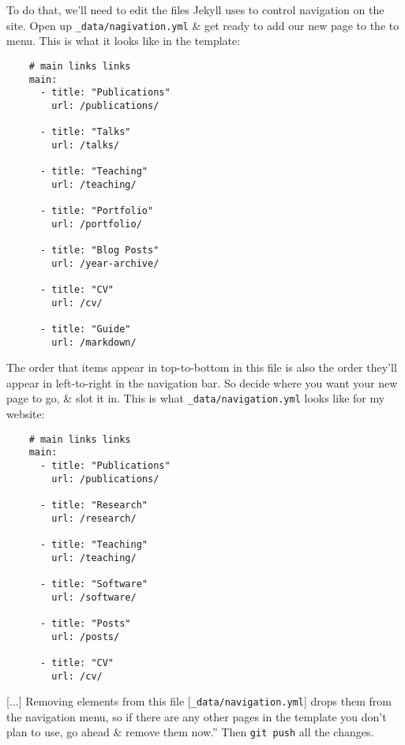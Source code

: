 \documentclass{article}
\numberwithin{equation}{section}
\begin{document}
To do that, we'll need to edit the files Jekyll uses to control navigation on the site. Open up \verb|_data/nagivation.yml| \& get ready to add our new page to the to menu. This is what it looks like in the template:
\begin{verbatim}
	# main links links
	main:
	  - title: "Publications"
	    url: /publications/
	
	  - title: "Talks"
	    url: /talks/    
	
	  - title: "Teaching"
	    url: /teaching/    
	    
	  - title: "Portfolio"
	    url: /portfolio/
	        
	  - title: "Blog Posts"
	    url: /year-archive/
	    
	  - title: "CV"
	    url: /cv/
	    
	  - title: "Guide"
	    url: /markdown/
\end{verbatim}
The order that items appear in top-to-bottom in this file is also the order they'll appear in left-to-right in the navigation bar. So decide where you want your new page to go, \& slot it in. This is what \verb|_data/navigation.yml| looks like for my website:
\begin{verbatim}
	# main links links
	main:
	  - title: "Publications"
	    url: /publications/
	    
	  - title: "Research"
	    url: /research/
	
	  - title: "Teaching"
	    url: /teaching/
	
	  - title: "Software"
	    url: /software/
	
	  - title: "Posts"
	    url: /posts/
	    
	  - title: "CV"
	    url: /cv/
\end{verbatim}
[$\ldots$] Removing elements from this file [\verb|_data/navigation.yml|] drops them from the navigation menu, so if there are any other pages in the template you don't plan to use, go ahead \& remove them now.'' Then \texttt{git push} all the changes.
\end{document}
